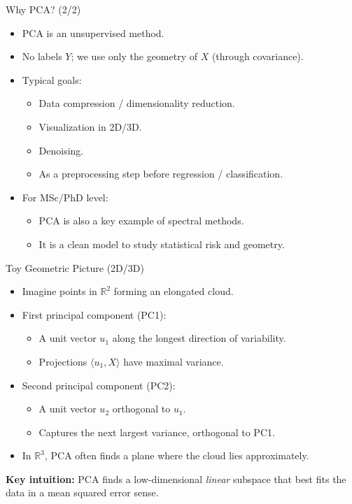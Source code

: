 \documentclass{beamer}
\newcommand{\R}{\mathbb{R}}
\newcommand{\1}{\mathbbm{1}}
\begin{document}
\begin{frame}{Why PCA? (2/2)} %
  \begin{itemize}
    \item PCA is an unsupervised method.
    \item No labels $Y$; we use only the geometry of $X$ (through covariance).
    \item Typical goals:
    \begin{itemize}
      \item Data compression / dimensionality reduction.
      \item Visualization in 2D/3D.
      \item Denoising.
      \item As a preprocessing step before regression / classification.
    \end{itemize}
    \item For MSc/PhD level:
    \begin{itemize}
      \item PCA is also a key example of spectral methods.
      \item It is a clean model to study statistical risk and geometry.
    \end{itemize}
  \end{itemize}
\end{frame}

\begin{frame}{Toy Geometric Picture (2D/3D)} %
  \begin{itemize}
    \item Imagine points in $\R^2$ forming an elongated cloud.
    \item First principal component (PC1):
    \begin{itemize}
      \item A unit vector $u_1$ along the longest direction of variability.
      \item Projections $\langle u_1, X \rangle$ have maximal variance.
    \end{itemize}
    \item Second principal component (PC2):
    \begin{itemize}
      \item A unit vector $u_2$ orthogonal to $u_1$.
      \item Captures the next largest variance, orthogonal to PC1.
    \end{itemize}
    \item In $\R^3$, PCA often finds a plane where the cloud lies approximately.
  \end{itemize}
  \vspace{0.3cm}
  \textbf{Key intuition:} PCA finds a low-dimensional \emph{linear} subspace
  that best fits the data in a mean squared error sense.
\end{frame}
\end{document}
